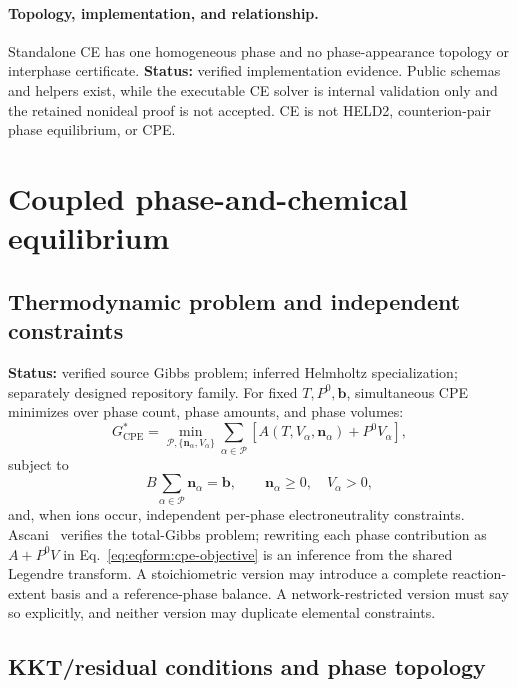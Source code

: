 \documentclass[11pt]{article}
\newcommand{\Evidence}[1]{\textsf{#1}}
\newcommand{\Status}[1]{\textbf{Status:} \Evidence{#1}.}
\begin{document}
\paragraph{Topology, implementation, and relationship.}
Standalone CE has one homogeneous phase and no phase-appearance topology or
interphase certificate. \Status{verified implementation evidence}
Public schemas and helpers exist, while the executable CE solver is internal
validation only and the retained nonideal proof is not accepted. CE is not
HELD2, counterion-pair phase equilibrium, or CPE.

\section{Coupled phase-and-chemical equilibrium}
\label{sec:eqform:cpe}

\subsection{Thermodynamic problem and independent constraints}

\Status{verified source Gibbs problem; inferred Helmholtz specialization;
separately designed repository family}
For fixed \(T,P^0,\boldsymbol b\), simultaneous CPE minimizes over phase count,
phase amounts, and phase volumes:
\begin{equation}
 G_{\mathrm{CPE}}^{*}
 =\min_{\mathcal P,\{\boldsymbol n_\alpha,V_\alpha\}}
 \sum_{\alpha\in\mathcal P}
 \left[A(T,V_\alpha,\boldsymbol n_\alpha)+P^0V_\alpha\right],
\label{eq:eqform:cpe-objective}
\end{equation}
subject to
\begin{equation}
 B\sum_{\alpha\in\mathcal P}\boldsymbol n_\alpha=\boldsymbol b,\qquad
 \boldsymbol n_\alpha\geq0,\quad V_\alpha>0,
\label{eq:eqform:cpe-constraints}
\end{equation}
and, when ions occur, independent per-phase electroneutrality constraints.
Ascani~\cite{Ascani2023} verifies the total-Gibbs problem; rewriting each
phase contribution as \(A+P^0V\) in
Eq.~\eqref{eq:eqform:cpe-objective} is an \Evidence{inference} from the shared
Legendre transform. A stoichiometric version may introduce a complete
reaction-extent basis and a reference-phase balance. A network-restricted
version must say so explicitly, and neither version may duplicate elemental
constraints.

\subsection{KKT/residual conditions and phase topology}
\end{document}
